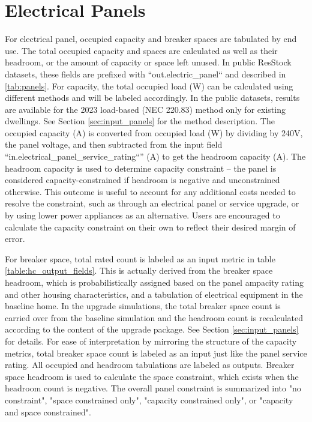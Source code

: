 \section{Electrical Panels} \label{sec:output_panels}
For electrical panel, occupied capacity and breaker spaces are tabulated by end use. The total occupied capacity and spaces are calculated as well as their headroom, or the amount of capacity or space left unused.  In public ResStock datasets, these fields are prefixed with ``out.electric\_panel`` and described in \ref{tab:panels}.
For capacity, the total occupied load (W) can be calculated using different methods and will be labeled accordingly. In the public datasets, results are available for the 2023 load-based (NEC 220.83) method only for existing dwellings. See Section \ref{sec:input_panels} for the method description. The occupied capacity (A) is converted from occupied load (W) by dividing by 240V, the panel voltage, and then subtracted from the input field ``in.electrical\_panel\_service\_rating``'' (A) to get the headroom capacity (A).
The headroom capacity is used to determine capacity constraint – the panel is considered capacity-constrained if headroom is negative and unconstrained otherwise. This outcome is useful to account for any additional costs needed to resolve the constraint, such as through an electrical panel or service upgrade, or by using lower power appliances as an alternative.
Users are encouraged to calculate the capacity constraint on their own to reflect their desired margin of error.

For breaker space, total rated count is labeled as an input metric in table \ref{table:hc_output_fields}. This is actually derived from the breaker space headroom, which is probabilistically assigned based on the panel ampacity rating and other housing characteristics, and a tabulation of electrical equipment in the baseline home. In the upgrade simulations, the total breaker space count is carried over from the baseline simulation and the headroom count is recalculated according to the content of the upgrade package. See Section \ref{sec:input_panels} for details.
For ease of interpretation by mirroring the structure of the capacity metrics, total breaker space count is labeled as an input just like the panel service rating. All occupied and headroom tabulations are labeled as outputs.
Breaker space headroom is used to calculate the space constraint, which exists when the headroom count is negative. The overall panel constraint is summarized into "no constraint", "space constrained only", "capacity constrained only", or "capacity and space constrained".

